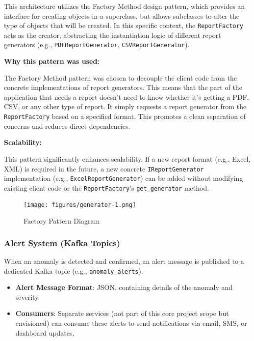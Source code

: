 This architecture utilizes the Factory Method design pattern, which provides an interface for creating objects in a superclass, but allows subclasses to alter the type of objects that will be created. In this specific context, the \texttt{ReportFactory} acts as the creator, abstracting the instantiation logic of different report generators (e.g., \texttt{PDFReportGenerator}, \texttt{CSVReportGenerator}).

\textbf{Why this pattern was used:}

The Factory Method pattern was chosen to decouple the client code from the concrete implementations of report generators. This means that the part of the application that needs a report doesn't need to know whether it's getting a PDF, CSV, or any other type of report. It simply requests a report generator from the \texttt{ReportFactory} based on a specified format. This promotes a clean separation of concerns and reduces direct dependencies.

\textbf{Scalability:}

This pattern significantly enhances scalability. If a new report format (e.g., Excel, XML) is required in the future, a new concrete \texttt{IReportGenerator} implementation (e.g., \texttt{ExcelReportGenerator}) can be added without modifying existing client code or the \texttt{ReportFactory}'s \texttt{get\_generator} method.

\begin{figure}[H]
    \centering
    \texttt{[image: figures/generator-1.png]}
    \caption{Factory Pattern Diagram}
    \label{fig:factory_pattern_diagram}
\end{figure}
 




\subsubsection{Alert System (Kafka Topics)}

When an anomaly is detected and confirmed, an alert message is published to a dedicated Kafka topic (e.g., \texttt{anomaly\_alerts}).
\begin{itemize}
    \item \textbf{Alert Message Format}: JSON, containing details of the anomaly and severity.
    \item \textbf{Consumers}: Separate services (not part of this core project scope but envisioned) can consume these alerts to send notifications via email, SMS, or dashboard updates.
\end{itemize}
